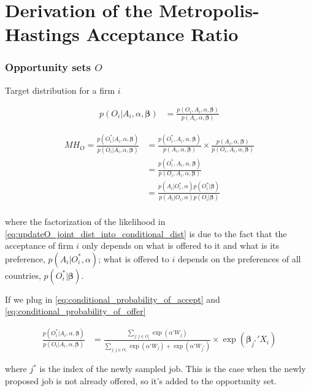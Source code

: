 \chapter{Derivation of the Metropolis-Hastings Acceptance Ratio}
\label{chap:MH_ratio}

\subsection{Opportunity sets \texorpdfstring{$O$}{O}}

Target distribution for a firm $i$ 

\begin{align}
p(O_i | A_i, \alpha, \bm{\beta}) &= \frac{p(O_i, A_i, \alpha, \bm{\beta})}{p(A_i, \alpha, \bm{\beta})}
\end{align}

\begin{align}
MH_O = \frac{p(O_i^* | A_i, \alpha, \bm{\beta})}{p(O_i | A_i, \alpha, \bm{\beta})} &= \frac{p(O_i^*, A_i, \alpha, \bm{\beta})}{p(A_i, \alpha, \bm{\beta})} \times \frac{p(A_i, \alpha, \bm{\beta})}{p(O_i, A_i, \alpha, \bm{\beta})} \\
&= \frac{p(O_i^*, A_i, \alpha, \bm{\beta})}{p(O_i, A_i, \alpha, \bm{\beta})} \\
&= \frac{p(A_i | O_i^*, \alpha)p(O_i^*|\bm{\beta})}{p(A_i | O_i, \alpha)p(O_i|\bm{\beta})} \label{eq:updateO_joint_dist_into_conditional_dist} \\
\end{align}

where the factorization of the likelihood in \eqref{eq:updateO_joint_dist_into_conditional_dist} is due to the fact that the acceptance of firm $i$ only depends on what is offered to it and what is its preference, $p(A_i | O_i^*, \alpha)$; what is offered to $i$ depends on the preferences of all countries, $p(O_i^* | \bm{\beta})$.

If we plug in \eqref{eq:conditional_probability_of_accept} and \eqref{eq:conditional_probability_of_offer}

\begin{align}
\frac{p(O_i^* | A_i, \alpha, \bm{\beta})}{p(O_i | A_i, \alpha, \bm{\beta})} &= \frac{\sum\limits_{j:j \in O_i} \exp(\alpha'W_j)}{\sum\limits_{j:j \in O_i} \exp(\alpha'W_j) + \exp(\alpha' W_{j^*})} \times \exp(\bm{\beta}_{j^*}'X_i)
\end{align}

where $j^*$ is the index of the newly sampled job. This is the case when the newly proposed job is not already offered, so it's added to the opportunity set.

